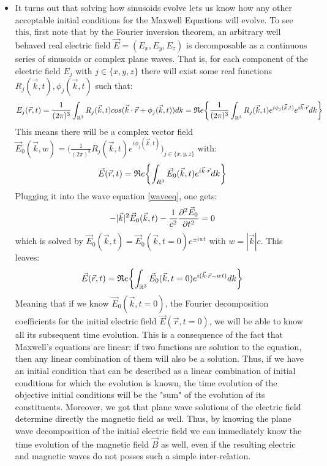 \documentclass[11pt, a4paper, twoside]{article} %
\newcommand{\R}{\mathbb{R}} %
\begin{document}
\begin{itemize}
\item It turns out that solving how sinusoids evolve lets us know how any other acceptable initial conditions for the Maxwell Equations will evolve. To see this, first note that by the Fourier inversion theorem, an arbitrary well behaved real electric field $\vec{E}=(E_x,E_y,E_z)$ is decomposable as a continuous series of sinusoids or complex plane waves. That is, for each component of the electric field $E_j$ with $j\in\{x,y,z\}$ there will exist some real functions $R_j(\vec{k},t),\phi_j(\vec{k},t)$ such that:\vspace{-0.1cm}
\begin{equation}
E_j(\vec{r},t)={\small \frac{1}{(2\pi)^3}}\int_{\R^3} R_j(\vec{k},t)cos(\vec{k}\cdot\vec{r}+\phi_j(\vec{k},t))dk
=\mathfrak{R}e\qty{{\small\frac{1}{(2\pi)^3}}\int_{\R^3}R_j(\vec{k},t)e^{i\phi_j(\vec{k},t)}e^{i\vec{k}\cdot\vec{r}}dk}\vspace{-0.1cm}
\end{equation}
This means there will be a complex vector field $\vec{E}_0(\vec{k},w)=(\frac{1}{(2\pi)^3}R_j(\vec{k},t)e^{i\phi_j(\vec{k},t)}\big)_{j\in\{x,y,z\}}$ with:\vspace{-0.1cm}
\begin{equation}
\vec{E}(\vec{r},t)=\mathfrak{R}e\qty{\int_{R^3}\vec{E}_0(\vec{k},t)e^{i\vec{k}\cdot\vec{r}}dk}\vspace{-0.1cm}
\end{equation}
Plugging it into the wave equation \eqref{waveeq}, one gets:\vspace{-0.2cm}
\begin{equation}
-|\vec{k}|^2\vec{E}_0(\vec{k},t)-\frac{1}{c^2}\pdv[2]{\vec{E}_0}{t}=0
\end{equation}
which is solved by $\vec{E}_0(\vec{k},t)=\vec{E}_0(\vec{k},t=0)e^{\pm iwt}$ with $w=|\vec{k}|c$. This leaves:
\begin{equation}
\vec{E}(\vec{r},t)=\mathfrak{R}e\qty{\int_{\R^3}\vec{E}_0(\vec{k},t=0)e^{i(\vec{k}\cdot\vec{r}-wt)}dk}
\end{equation}
Meaning that if we know $\vec{E}_0(\vec{k},t=0)$, the Fourier decomposition coefficients for the initial electric field $\vec{E}(\vec{r},t=0)$, we will be able to know all its subsequent time evolution. This is a consequence of the fact that Maxwell's equations are linear: if two functions are solution to the equation, then any linear combination of them will also be a solution. Thus, if we have an initial condition that can be described as a linear combination of initial conditions for which the evolution is known, the time evolution of the objective initial conditions will be the "sum" of the evolution of its constituents. Moreover, we got that plane wave solutions of the electric field determine directly the magnetic field as well. Thus, by knowing the plane wave decomposition of the initial electric field we can immediately know the time evolution of the magnetic field $\vec{B}$ as well, even if the resulting electric and magnetic waves do not posses such a simple inter-relation.



\end{itemize}
\end{document}
